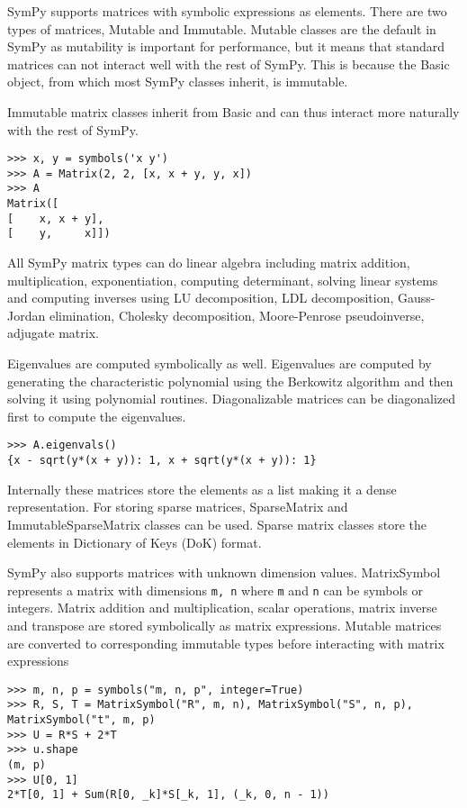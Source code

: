 SymPy supports matrices with symbolic expressions as elements. There are two
types of matrices, Mutable and Immutable. Mutable classes are the default in
SymPy as mutability is important for performance, but it means that standard
matrices can not interact well with the rest of SymPy. This is because the
Basic object, from which most SymPy classes inherit, is immutable.

Immutable matrix classes inherit from Basic and can thus interact more
naturally with the rest of SymPy.

\begin{verbatim}
>>> x, y = symbols('x y')
>>> A = Matrix(2, 2, [x, x + y, y, x])
>>> A
Matrix([
[    x, x + y],
[    y,     x]])
\end{verbatim}

All SymPy matrix types can do linear algebra including matrix addition,
multiplication, exponentiation, computing determinant, solving linear
systems and computing inverses using LU decomposition, LDL decomposition,
Gauss-Jordan elimination, Cholesky decomposition, Moore-Penrose pseudoinverse,
adjugate matrix.

Eigenvalues are computed symbolically as well. Eigenvalues are computed by
generating the characteristic polynomial using the Berkowitz algorithm and
then solving it using polynomial routines. Diagonalizable matrices can be
diagonalized first to compute the eigenvalues.

\begin{verbatim}
>>> A.eigenvals()
{x - sqrt(y*(x + y)): 1, x + sqrt(y*(x + y)): 1}
\end{verbatim}

Internally these matrices store the elements as a list making it a dense
representation. For storing sparse matrices, SparseMatrix and
ImmutableSparseMatrix classes can be used. Sparse matrix classes store
the elements in Dictionary of Keys (DoK) format.

SymPy also supports matrices with unknown dimension values. MatrixSymbol
represents a matrix with dimensions \verb|m, n| where \verb|m| and \verb|n|
can be symbols or integers. Matrix addition and multiplication, scalar
operations, matrix inverse and transpose are stored symbolically as
matrix expressions. Mutable matrices are converted to corresponding immutable
types before interacting with matrix expressions

\begin{verbatim}
>>> m, n, p = symbols("m, n, p", integer=True)
>>> R, S, T = MatrixSymbol("R", m, n), MatrixSymbol("S", n, p), MatrixSymbol("t", m, p)
>>> U = R*S + 2*T
>>> u.shape
(m, p)
>>> U[0, 1]
2*T[0, 1] + Sum(R[0, _k]*S[_k, 1], (_k, 0, n - 1))
\end{verbatim}

